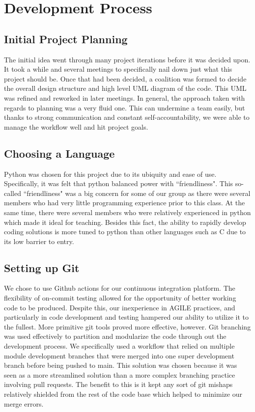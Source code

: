 \documentclass[10pt,letterpaper]{article}
\begin{document}
\section{Development Process}
\subsection{Initial Project Planning}
The initial idea went through many project iterations before it was decided upon. It took a while and several meetings to specifically nail down just what this project should be. Once that had been decided, a coalition was formed to decide the overall design structure and high level UML diagram of the code. This UML was refined and reworked in later meetings. In general, the approach taken with regards to planning was a very fluid one. This can undermine a team easily, but thanks to strong communication and constant self-accountability, we were able to manage the workflow well and hit project goals. 

\subsection{Choosing a Language}
Python was chosen for this project due to its ubiquity and ease of use. Specifically, it was felt that python balanced power with ``friendliness". This so-called ``friendliness" was a big concern for some of our group as there were several members who had very little programming experience prior to this class. At the same time, there were several members who were relatively experienced in python which made it ideal for teaching. Besides this fact, the ability to rapidly develop coding solutions is more tuned to python than other languages such as C due to its low barrier to entry.

\subsection{Setting up Git}
We chose to use Github actions for our continuous integration platform. The flexibility of on-commit testing allowed for the opportunity of better working code to be produced. Despite this, our inexperience in AGILE practices, and particularly in code development and testing hampered our ability to utilize it to the fullest. More primitive git tools proved more effective, however. Git branching was used effectively to partition and modularize the code through out the development process. We specifically used a workflow that relied on multiple module development branches that were merged into one super development branch before being pushed to main. This solution was chosen because it was seen as a more streamlined solution than a more complex branching practice involving pull requests. The benefit to this is it kept any sort of git mishaps relatively shielded from the rest of the code base which helped to minimize our merge errors.
\end{document}
